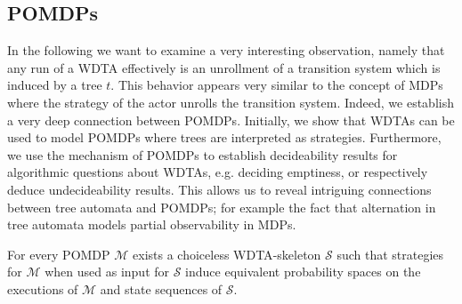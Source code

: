 \subsection{\aclp{POMDP}}
In the following we want to examine a very interesting observation, namely that
any run of a \ac{WDTA} effectively is an unrollment of a transition system 
which is induced by a tree $t$. This behavior appears very similar to the 
concept of \acp{MDP} where the strategy of the actor unrolls the transition 
system.  Indeed, we establish a very deep connection between \acp{POMDP}. 
Initially, we show that \acp{WDTA} can be used to model \acp{POMDP} where trees 
are interpreted as strategies. Furthermore, we use the mechanism of \acp{POMDP} 
to establish decideability results for algorithmic questions about \acp{WDTA},
e.g. deciding emptiness, or respectively deduce undecideability results. This 
allows us to reveal intriguing connections between tree automata and 
\acp{POMDP}; for example the fact that alternation in tree automata models 
partial observability in \acp{MDP}.
\begin{theorem}
  For every \ac{POMDP} $\mathcal{M}$ exists a choiceless \ac{WDTA}-skeleton 
  $\mathcal{S}$ such that strategies for $\mathcal{M}$ when used as input
  for $\mathcal{S}$ induce equivalent probability spaces on the executions of 
  $\mathcal{M}$ and state sequences of $\mathcal{S}$.
  \label{thm:POMDPequivWDTA}
\end{theorem}

